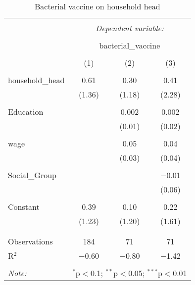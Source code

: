 \documentclass{article}
\begin{document}
\begin{table}[!htbp] \centering 
  \caption{Bacterial vaccine on household head} 
  \label{} 
\begin{tabular}{@{\extracolsep{5pt}}lccc} 
\\[-1.8ex]\hline 
\hline \\[-1.8ex] 
 & \multicolumn{3}{c}{\textit{Dependent variable:}} \\ 
\cline{2-4} 
\\[-1.8ex] & \multicolumn{3}{c}{bacterial\_vaccine} \\ 
\\[-1.8ex] & (1) & (2) & (3)\\ 
\hline \\[-1.8ex] 
 household\_head & 0.61 & 0.30 & 0.41 \\ 
  & (1.36) & (1.18) & (2.28) \\ 
  & & & \\ 
 Education &  & 0.002 & 0.002 \\ 
  &  & (0.01) & (0.02) \\ 
  & & & \\ 
 wage &  & 0.05 & 0.04 \\ 
  &  & (0.03) & (0.04) \\ 
  & & & \\ 
   Social\_Group &  &  & $-$0.01 \\ 
  &  &  & (0.06) \\ 
  & & & \\ 
 Constant & 0.39 & 0.10 & 0.22 \\ 
  & (1.23) & (1.20) & (1.61) \\ 
  & & & \\ 
\hline \\[-1.8ex] 
Observations & 184 & 71 & 71 \\ 
R$^{2}$ & $-$0.60 & $-$0.80 & $-$1.42 \\ 
\hline 
\hline \\[-1.8ex] 
\textit{Note:}  & \multicolumn{3}{r}{$^{*}$p$<$0.1; $^{**}$p$<$0.05; $^{***}$p$<$0.01} \\ 
\end{tabular} 
\end{table} 
\end{document}
